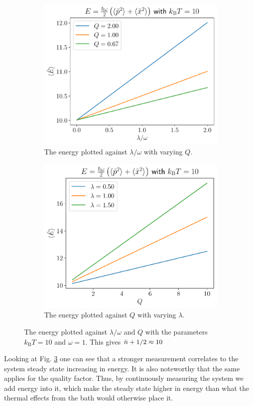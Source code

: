 \begin{figure}[ht]
    \centering
    \begin{subfigure}[t]{0.48\textwidth}
        \includegraphics[width=\textwidth]{figures/E_vs_lambda}
        \caption{The energy plotted against $\lambda / \omega$ with varying $Q$.}
        \label{fig:E_vs_lambda}
    \end{subfigure}
    \hfill
    \begin{subfigure}[t]{0.48\textwidth}
        \includegraphics[width=\textwidth]{figures/E_vs_Q}
        \caption{The energy plotted against $Q$ with varying $\lambda$.}
        \label{fig:E_vs_Q}
    \end{subfigure}
    \caption{The energy plotted against $\lambda / \omega$ and $Q$ with the parameters $k_\mathrm{B}T = 10$ and $\omega = 1$. This gives $\bar{n} + 1/2 \approx 10 $}
    \label{fig:E_plots}
\end{figure}
Looking at Fig. \ref{fig:E_plots} one can see that a stronger measurement correlates to the system steady state increasing in energy. It is also noteworthy that the same applies for the quality factor. Thus, by continuously measuring the system we add energy into it, which make the steady state higher in energy than what the thermal effects from the bath would otherwise place it. 